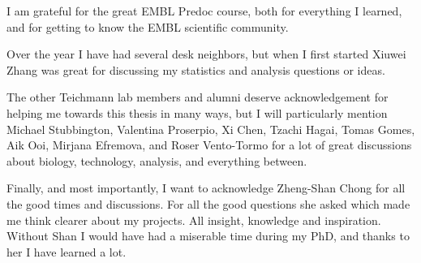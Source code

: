 \begin{acknowledgements}
I am grateful for the great EMBL Predoc course, both for everything I learned, and for getting to know the EMBL scientific community.

Over the year I have had several desk neighbors, but when I first started Xiuwei Zhang was great for discussing my statistics and analysis questions or ideas.

The other Teichmann lab members and alumni deserve acknowledgement for helping me towards this thesis in many ways, but I will particularly mention Michael Stubbington, Valentina Proserpio, Xi Chen, Tzachi Hagai, Tomas Gomes, Aik Ooi, Mirjana Efremova, and Roser Vento-Tormo for a lot of great discussions about biology, technology, analysis, and everything between.

Finally, and most importantly, I want to acknowledge Zheng-Shan Chong for all the good times and discussions. For all the good questions she asked which made me think clearer about my projects. All insight, knowledge and inspiration. Without Shan I would have had a miserable time during my PhD, and thanks to her I have learned a lot.

\end{acknowledgements}

